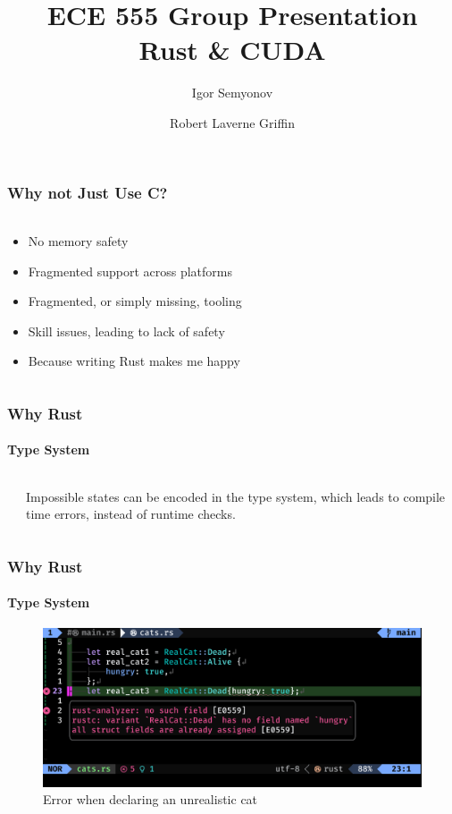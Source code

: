 \documentclass[aspectratio=169]{beamer}
\title[Short Title]{
    ECE 555 Group Presentation \\
    Rust \& CUDA
}
\author{
	Igor Semyonov
	\and Robert Laverne Griffin
}
\institute{
    George Mason University, Department of Electrical and Computer Engineering
}
\begin{document}
\begin{frame}
	\vspace{-1.8cm}
	\titlepage
\end{frame}

\begin{frame}
	\frametitle{Why not Just Use C?}
	\framesubtitle{}

	\begin{columns}
		\begin{column}{0.6\textwidth}
			\begin{itemize}
				\item No memory safety
				\item Fragmented support across platforms
				\item Fragmented, or simply missing, tooling
				\item Skill issues, leading to lack of safety
				\item Because writing Rust makes me happy
			\end{itemize}
		\end{column}
	\end{columns}
\end{frame}

\begin{frame}
	\frametitle{Why Rust}
	\framesubtitle{Type System}

	\begin{columns}
		\begin{column}{0.4\textwidth}
			
		\end{column}
		\begin{column}{0.5\textwidth}
			Impossible states can be encoded in the type system, which leads to compile time errors, instead of runtime checks.
			
		\end{column}
	\end{columns}
\end{frame}

\begin{frame}
	\frametitle{Why Rust}
	\framesubtitle{Type System}
	\begin{figure}[ht]
		\centering
		\includegraphics[width=\textwidth]{./figures/real-cat.png}
		\caption{Error when declaring an unrealistic cat}
	\end{figure}
\end{frame}
\end{document}
